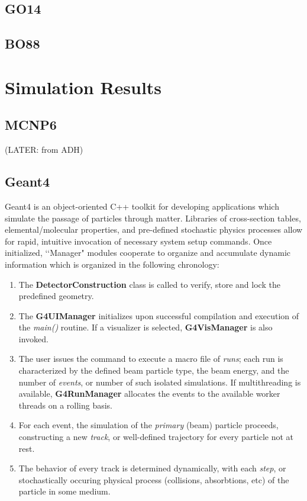 \documentclass{mc2015}
\begin{document}
\subsection{GO14}


\subsection{BO88}


\section{Simulation Results}


\subsection{MCNP6}
(LATER: from ADH)

\subsection{Geant4}

Geant4 is an object-oriented C++ toolkit for developing applications which simulate the passage of particles through matter. Libraries of cross-section tables, elemental/molecular properties, and pre-defined stochastic physics processes allow for rapid, intuitive invocation of necessary system setup commands. Once initialized, \lq\lq Manager" modules cooperate to organize and accumulate dynamic information which is organized in the following chronology:

\begin{enumerate}
\item The \textbf{DetectorConstruction} class is called to verify, store and lock the predefined geometry.
\item The \textbf{G4UIManager} initializes upon successful compilation and execution of the \emph{main()} routine.  If a visualizer is selected, \textbf{G4VisManager} is also invoked.
\item The user issues the command to execute a macro file of \emph{runs}; each run is characterized by the defined beam particle type, the beam energy, and the number of \emph{events}, or number of such isolated simulations.  If multithreading is available, \textbf{G4RunManager} allocates the events to the available worker threads on a rolling basis.
\item For each event, the simulation of the \emph{primary} (beam) particle proceeds, constructing a new \emph{track}, or well-defined trajectory for every particle not at rest.
\item The behavior of every track is determined dynamically, with each \emph{step}, or stochastically occuring physical process (collisions, absorbtions, etc) of the particle in some medium.
\end{enumerate}
\end{document}
